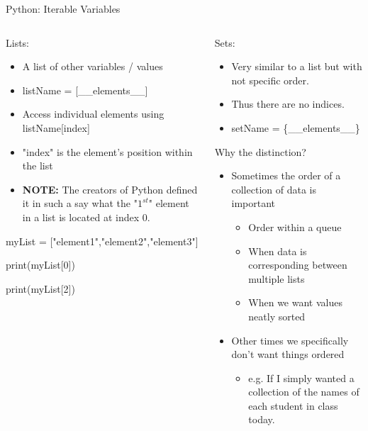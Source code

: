 \documentclass[10pt, aspectratio=169]{beamer}
\begin{document}
\begin{frame}[t]{Python: Iterable Variables}
    \begin{columns}[t]
        \begin{column}[t]{0.5\textwidth}
            Lists:
            \begin{itemize}
                \item A list of other variables / values
                \item listName = [\_\_elements\_\_]
                \item Access individual elements using listName[index]
                \item "index" is the element's position within the list
                \item \textbf{NOTE:} The creators of Python defined it in such a say what the "$1^{st}$" element in a list is located at index 0.
            \end{itemize}
            \vspace{1cm}
            myList = ["element1","element2","element3"]

            print(myList[0])

            print(myList[2])
        \end{column}
        \begin{column}[t]{0.5\textwidth}
            Sets:
            \begin{itemize}
                \item Very similar to a list but with not specific order.
                \item Thus there are no indices.
                \item setName = \{\_\_elements\_\_\}
            \end{itemize}
            Why the distinction?
            \begin{itemize}
                \item Sometimes the order of a collection of data is important
                \begin{itemize}
                    \item Order within a queue
                    \item When data is corresponding between multiple lists
                    \item When we want values neatly sorted
                \end{itemize}
                \item Other times we specifically don't want things ordered
                \begin{itemize}
                    \item e.g. If I simply wanted a collection of the names of each student in class today.
                \end{itemize}
            \end{itemize}
        \end{column}
    \end{columns}
\end{frame}
\end{document}
